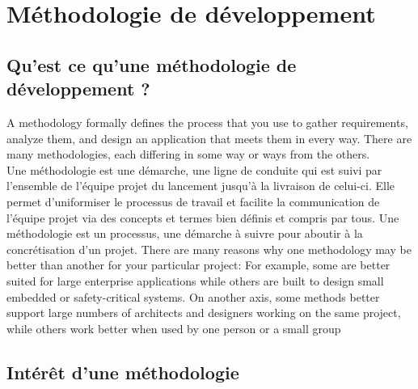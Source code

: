 \chapter{Méthodologie de développement}
\minitoc
\clearpage
\section{Qu'est ce qu'une méthodologie de développement ?}
A methodology formally defines the process that you use to gather requirements, analyze them, and design an application that meets them in every way. There are many methodologies, each differing in some way or ways from the others. \\
Une méthodologie est une démarche, une ligne de conduite qui est suivi par l’ensemble de l’équipe projet du lancement jusqu’à la livraison de celui-ci. Elle permet d’uniformiser le processus de travail et facilite la communication de l’équipe projet via des concepts et termes bien définis et compris par tous.
Une méthodologie est un processus, une démarche à suivre pour aboutir à la concrétisation d'un projet.
There are many reasons why one methodology may be better than another for your particular project: For example, some are better suited for large enterprise applications while others are built to design small embedded or safety-critical systems. On another axis, some methods better support large numbers of architects and designers working on the same project, while others work better when used by one person or a small group

\section{Intérêt d'une méthodologie}



                             

